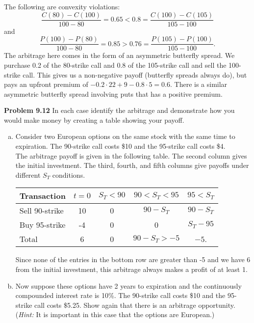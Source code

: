 \documentclass[12pt]{article}
\newcommand{\problem}[1]{\bigskip \noindent \textbf{Problem #1}}
\theoremstyle{plain}
\begin{document}
The following are convexity violations:
\[
\frac{C(80) - C(100)}{100 - 80} = 0.65 < 0.8 = \frac{C(100) - C(105)}{105 - 100}
\]
and
\[
\frac{P(100) - P(80)}{100 - 80} = 0.85 > 0.76 = \frac{P(105) - P(100)}{105 - 100}.
\]
The arbitrage here comes in the form of an asymmetric butterfly spread. We purchase 0.2 of the 80-strike call and 0.8 of the 105-strike call and sell the 100-strike call. This gives us a non-negative payoff (butterfly spreads always do), but pays an upfront premium of $-0.2\cdot22 + 9 - 0.8\cdot5 = 0.6$. There is a similar asymmetric butterfly spread involving puts that has a positive premium.

\problem{9.12} In each case identify the arbitrage and demonstrate how you would make money by creating a table showing your payoff.
\begin{enumerate}[(a)]
\item Consider two European options on the same stock with the same time to expiration. The 90-strike call costs \$10 and the 95-strike call costs \$4.\\

The arbitrage payoff is given in the following table. The second column gives the initial investment. The third, fourth, and fifth columns give payoffs under different $S_T$ conditions.
\begin{center}
\begin{tabular}{l||cccc}
Transaction & $t = 0$ & $S_T < 90$ & $90<S_T<95$ & $95 < S_T$ \\ \hline \hline
Sell 90-strike & 10 & 0 & $90 - S_T$ & $90 - S_T$\\
Buy 95-strike & -4 & 0 & 0 & $S_T - 95$\\
Total & 6 & 0 & $90 - S_T > -5$ & $-5$.
\end{tabular}
\end{center}
Since none of the entries in the bottom row are greater than -5 and we have 6 from the initial investment, this arbitrage always makes a profit of at least 1.

\item Now suppose these options have 2 years to expiration and the continuously compounded interest rate is 10\%. The 90-strike call costs \$10 and the 95-strike call costs \$5.25. Show again that there is an arbitrage opportunity. (\emph{Hint:} It is important in this case that the options are European.)\\


\end{enumerate}
\end{document}
